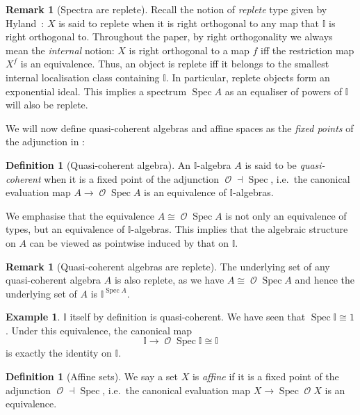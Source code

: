 \documentclass[a4paper,12pt]{amsart}
\theoremstyle{definition}
\newtheorem{example}[theorem]{Example}
\newtheorem{definition}[theorem]{Definition}
\newtheorem{remark}[theorem]{Remark}
\newcommand{\mc}[1]{\mathcal{#1}}
\newcommand{\mbb}[1]{\mathbb{#1}}
\newcommand{\I}{\mbb I}
\newcommand{\spec}{\operatorname{Spec}}
\newcommand{\opens}{\operatorname{\mc{O}}} %
\begin{document}
\begin{remark}[Spectra are replete]\label{rem:specarereplete}
  Recall the notion of \emph{replete} type given by Hyland~\cite{hyland1990first}: $X$ is said to replete when it is right orthogonal to any map that $\I$ is right orthogonal to. Throughout the paper, by right orthogonality we always mean the \emph{internal} notion: $X$ is right orthogonal to a map $f$ iff the restriction map $X^f$ is an equivalence. Thus, an object is replete iff it belongs to the smallest internal localisation class containing $\I$. In particular, replete objects form an exponential ideal. This implies a spectrum $\spec A$ as an equaliser of powers of $\I$ will also be replete.
\end{remark}

We will now define quasi-coherent algebras and affine spaces as the \emph{fixed points} of the adjunction in :

\begin{definition}[Quasi-coherent algebra]
  An $\I$-algebra $A$ is said to be \emph{quasi-coherent} when it is a fixed point of the adjunction $\opens \dashv \spec$, i.e.\ the canonical evaluation map $A \to \opens{\spec A}$ is an equivalence of $\I$-algebras.
\end{definition}

We emphasise that the equivalence $A \cong \opens{\spec A}$ is not only an equivalence of types, but an equivalence of $\I$-algebras. This implies that the algebraic structure on $A$ can be viewed as pointwise induced by that on $\I$. 

\begin{remark}[Quasi-coherent algebras are replete]\label{rem:qcreplete}
  The underlying set of any quasi-coherent algebra $A$ is also replete, as we have $A\cong \opens{\spec{A}}$ and hence the underlying set of $A$ is $\I^{\spec{A}}$.
\end{remark}

\begin{example}\label{exm:intervalqc}
  $\I$ itself by definition is quasi-coherent. We have seen that $\spec \I \cong 1$. Under this equivalence, the canonical map 
  \[ \I \to \opens{\spec \I} \cong \I \]
  is exactly the identity on $\I$.
\end{example}

\begin{definition}[Affine sets]
  We say a set $X$ is \emph{affine} if it is a fixed point of the adjunction $\opens \dashv \spec$, i.e.\ the canonical evaluation map $X \to \spec\opens X$ is an equivalence.
\end{definition}
\end{document}
